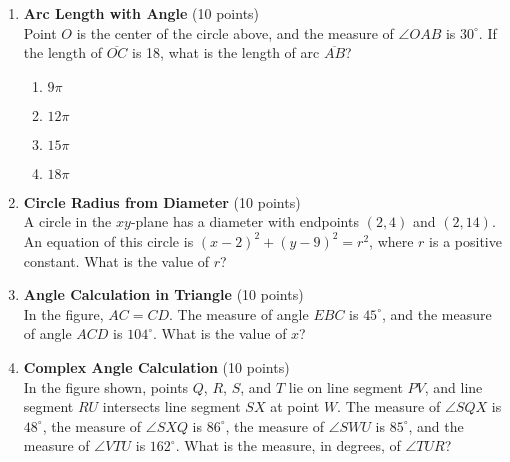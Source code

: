 \begin{enumerate}
  \item \textbf{Arc Length with Angle} (10 points)\\
  Point $O$ is the center of the circle above, and the measure of $\angle OAB$ is $30^{\circ}$. If the length of $\overline{OC}$ is 18, what is the length of arc $\overline{AB}$?
  \begin{enumerate}[label=(\Alph*)]
    \item $9\pi$
    \item $12\pi$
    \item $15\pi$
    \item $18\pi$
  \end{enumerate}
  \begin{subanswer}
  \end{subanswer}

  \item \textbf{Circle Radius from Diameter} (10 points)\\
  A circle in the $xy$-plane has a diameter with endpoints $(2,4)$ and $(2,14)$. An equation of this circle is $(x-2)^{2}+(y-9)^{2}=r^{2}$, where $r$ is a positive constant. What is the value of $r$?
  \begin{subanswer}
  \end{subanswer}

  \newpage

  \item \textbf{Angle Calculation in Triangle} (10 points)\\
  In the figure, $AC=CD$. The measure of angle $EBC$ is $45^{\circ}$, and the measure of angle $ACD$ is $104^{\circ}$. What is the value of $x$?
  \begin{subanswer}
  \end{subanswer}

  \item \textbf{Complex Angle Calculation} (10 points)\\
  In the figure shown, points $Q$, $R$, $S$, and $T$ lie on line segment $PV$, and line segment $RU$ intersects line segment $SX$ at point $W$. The measure of $\angle SQX$ is $48^{\circ}$, the measure of $\angle SXQ$ is $86^{\circ}$, the measure of $\angle SWU$ is $85^{\circ}$, and the measure of $\angle VTU$ is $162^{\circ}$. What is the measure, in degrees, of $\angle TUR$?
  \begin{subanswer}
  \end{subanswer}


\end{enumerate}
